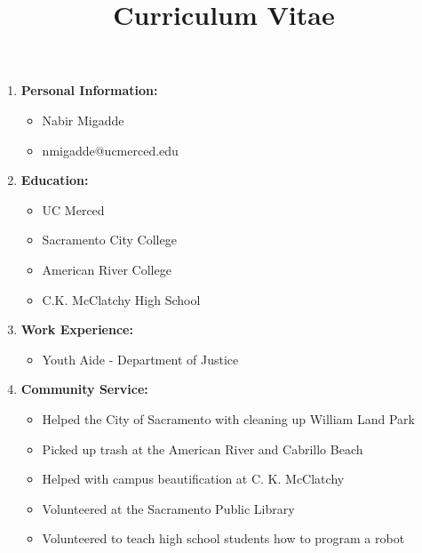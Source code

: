 \documentclass[11pt]{article}
\begin{document}
\title{Curriculum Vitae}
\maketitle

\begin{enumerate}

\item
\textbf{Personal Information:}
\begin{itemize}
    \item Nabir Migadde
    \item nmigadde@ucmerced.edu
\end{itemize}

\item
\textbf{Education:}
\begin{itemize}
    \item UC Merced
    \item Sacramento City College
    \item American River College
    \item C.K. McClatchy High School
\end{itemize}

\item
\textbf{Work Experience:}
\begin{itemize}
    \item Youth Aide - Department of Justice
\end{itemize}

\item
\textbf{Community Service:}
\begin{itemize}
    \item Helped the City of Sacramento with cleaning up William Land Park
    \item Picked up trash at the American River and Cabrillo Beach
    \item Helped with campus beautification at C. K. McClatchy
    \item Volunteered at the Sacramento Public Library
    \item Volunteered to teach high school students how to program a robot
\end{itemize}

\end{enumerate}
\end{document}
